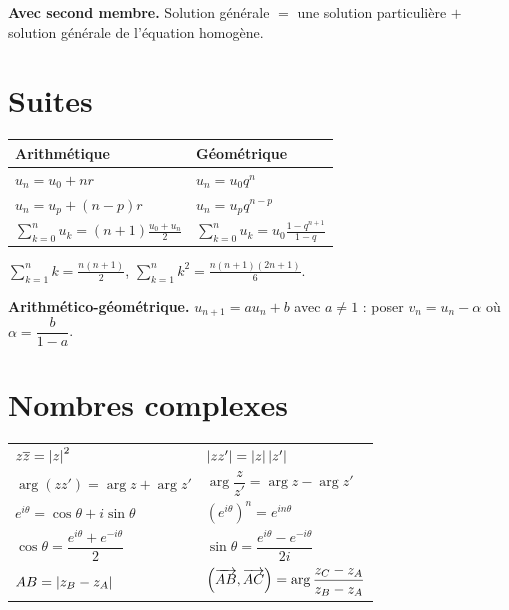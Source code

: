 \noindent
\textbf{Avec second membre.} Solution générale $=$ une solution particulière
$+$ solution générale de l'équation homogène.

\section*{Suites}

\begin{center}
\setlength{\tabcolsep}{10pt}
\renewcommand{\arraystretch}{1.6}
\begin{tabular}{@{}ll@{}}
\toprule
Arithmétique & Géométrique \\
\midrule
$u_{n} = u_{0}+nr$ & $u_{n} = u_{0}q^{n}$ \\
$u_{n} = u_{p}+(n-p)r$ & $u_{n} = u_{p}q^{n-p}$ \\
$\displaystyle\sum_{k=0}^{n}u_{k} = (n+1)\frac{u_{0}+u_{n}}{2}$ &
$\displaystyle\sum_{k=0}^{n}u_{k} = u_{0}\frac{1-q^{n+1}}{1-q}$ \\
\bottomrule
\end{tabular}
\end{center}

\noindent
$\displaystyle\sum_{k=1}^{n}k = \frac{n(n+1)}{2}$, \quad
$\displaystyle\sum_{k=1}^{n}k^{2} = \frac{n(n+1)(2n+1)}{6}$.

\smallskip
\noindent
\textbf{Arithmético-géométrique.} $u_{n+1} = au_{n}+b$ avec $a \neq 1$ :
poser $v_{n} = u_{n}-\alpha$ où $\alpha = \dfrac{b}{1-a}$.

\section*{Nombres complexes}

\begin{center}
\setlength{\tabcolsep}{10pt}
\renewcommand{\arraystretch}{1.55}
\begin{tabular}{@{}ll@{}}
\toprule
$z\overline z = \left|z\right|^{2}$ & $\left|zz'\right| = \left|z\right|\left|z'\right|$ \\
$\arg(zz') = \arg z+\arg z'$ & $\arg\dfrac{z}{z'} = \arg z-\arg z'$ \\
$e^{i\theta} = \cos\theta+i\sin\theta$ &
  $\left(e^{i\theta}\right)^{n} = e^{in\theta}$ \\
$\cos\theta = \dfrac{e^{i\theta}+e^{-i\theta}}{2}$ &
$\sin\theta = \dfrac{e^{i\theta}-e^{-i\theta}}{2i}$ \\
$AB = \left|z_{B}-z_{A}\right|$ &
$\left(\overrightarrow{AB},\overrightarrow{AC}\right)
 = \arg\dfrac{z_{C}-z_{A}}{z_{B}-z_{A}}$ \\
\bottomrule
\end{tabular}
\end{center}

